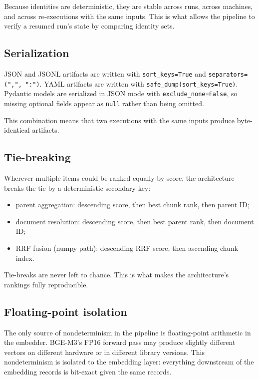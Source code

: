 \documentclass[11pt,a4paper]{article}
\begin{document}
Because identities are deterministic, they are stable across runs,
across machines, and across re-executions with the same inputs. This
is what allows the pipeline to verify a resumed run's state by
comparing identity sets.

\subsection{Serialization}
JSON and JSONL artifacts are written with \texttt{sort\_keys=True}
and \texttt{separators=(",", ":")}. YAML artifacts are written with
\texttt{safe\_dump(sort\_keys=True)}. Pydantic models are serialized
in JSON mode with \texttt{exclude\_none=False}, so missing optional
fields appear as \texttt{null} rather than being omitted.

This combination means that two executions with the same inputs
produce byte-identical artifacts.

\subsection{Tie-breaking}
Wherever multiple items could be ranked equally by score, the
architecture breaks the tie by a deterministic secondary key:

\begin{itemize}[leftmargin=1.5em,itemsep=0.15em]
  \item parent aggregation: descending score, then best chunk
    rank, then parent ID;
  \item document resolution: descending score, then best parent
    rank, then document ID;
  \item RRF fusion (numpy path): descending RRF score, then
    ascending chunk index.
\end{itemize}

Tie-breaks are never left to chance. This is what makes the
architecture's rankings fully reproducible.

\subsection{Floating-point isolation}
The only source of nondeterminism in the pipeline is
floating-point arithmetic in the embedder. BGE-M3's FP16 forward
pass may produce slightly different vectors on different hardware
or in different library versions. This nondeterminism is isolated
to the embedding layer: everything downstream of the embedding
records is bit-exact given the same records.
\end{document}
